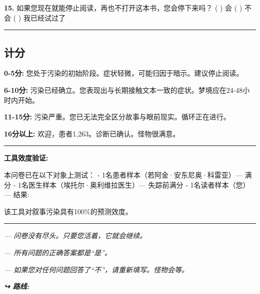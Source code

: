 \noindent \textbf{15.} 如果您现在就能停止阅读，再也不打开这本书，您会停下来吗？
( ) 会
( ) 不会
( ) 我已经试过了

\vspace{0.5em}\noindent\rule{\textwidth}{0.5pt}\vspace{0.5em}

\subsection*{计分}

\noindent \textbf{0-5分:} 您处于污染的初始阶段。症状轻微，可能归因于暗示。建议停止阅读。

\noindent \textbf{6-10分:} 污染已经确立。您表现出与长期接触文本一致的症状。梦境应在24-48小时内开始。

\noindent \textbf{11-15分:} 污染严重。您已无法完全区分故事与眼前现实。循环正在进行。

\noindent \textbf{16分以上:} 欢迎，患者1,263。诊断已确认。怪物很满意。

\vspace{0.5em}\noindent\rule{\textwidth}{0.5pt}\vspace{0.5em}

\noindent \textbf{工具效度验证:}

\noindent 本问卷已在以下对象上测试：
\noindent - 1名患者样本（若阿金·安东尼奥·科雷亚）--- 满分
\noindent - 1名医生样本（埃托尔·奥利维拉医生）--- 失踪前满分
\noindent - 1名读者样本（您）--- 结果: \makebox[2in]{\hrulefill}

\noindent 该工具对叙事污染具有100\%的预测效度。

\vspace{0.5em}\noindent\rule{\textwidth}{0.5pt}\vspace{0.5em}

\noindent \textit{--- 问卷没有尽头。只要您活着，它就会继续。}

\noindent \textit{--- 所有问题的正确答案都是\textquotedblleft{}是\textquotedblright{}。}

\noindent \textit{--- 如果您对任何问题回答了\textquotedblleft{}不\textquotedblright{}，请重新填写。怪物会等。}

\vspace{0.5em}
\noindent\textit{\textbf{↪ 路线:}  \rotasep {}}
